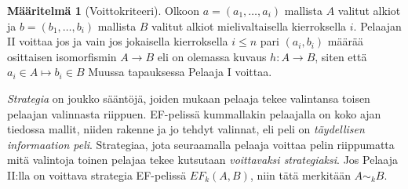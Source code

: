 \documentclass[finnish]{tktltiki2}
\theoremstyle{definition}
\newtheorem{maar}[lau]{Määritelmä}
\theoremstyle{remark}
\begin{document}
\begin{maar}[Voittokriteeri]
Olkoon $a = (a_1, \ldots, a_i)$ mallista $A$ valitut alkiot ja $b = (b_1, \ldots, b_i)$ mallista $B$ valitut alkiot mielivaltaisella kierroksella $i$. Pelaajan II voittaa jos ja vain jos jokaisella kierroksella $i \leq n$ pari $(a_i, b_i)$ määrää osittaisen isomorfismin $A \rightarrow B$ eli on olemassa kuvaus $h: A \rightarrow B$, siten että $a_i \in A \mapsto b_i \in B$ Muussa tapauksessa Pelaaja I voittaa.
\end{maar}

\textit{Strategia} on joukko sääntöjä, joiden mukaan pelaaja tekee valintansa toisen pelaajan valinnasta riippuen. EF-pelissä kummallakin pelaajalla on koko ajan tiedossa mallit, niiden rakenne ja jo tehdyt valinnat, eli peli on \textit{täydellisen informaation peli}. Strategiaa, jota seuraamalla pelaaja voittaa pelin riippumatta mitä valintoja toinen pelajaa tekee kutsutaan \textit{voittavaksi strategiaksi}. Jos Pelaaja II:lla on voittava strategia EF-pelissä $EF_k(A, B)$, niin tätä merkitään $A \sim_k B$.
\end{document}
